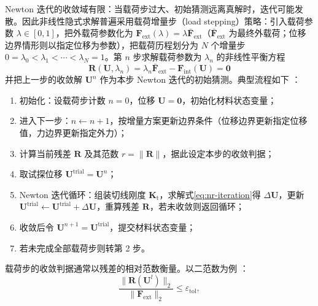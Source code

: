 Newton 迭代的收敛域有限：当载荷步过大、初始猜测远离真解时，迭代可能发散。因此非线性隐式求解普遍采用载荷增量步（load stepping）策略：引入载荷参数 $\lambda\in[0,1]$，把外载荷参数化为 $\mathbf{F}_{\mathrm{ext}}(\lambda)=\lambda\bar{\mathbf{F}}_{\mathrm{ext}}$（$\bar{\mathbf{F}}_{\mathrm{ext}}$ 为最终外载荷；位移边界情形则以指定位移为参数），把载荷历程划分为 $N$ 个增量步 $0=\lambda_{0}<\lambda_{1}<\cdots<\lambda_{N}=1$。第 $n$ 步求解载荷参数为 $\lambda_{n}$ 的非线性平衡方程
\begin{equation}
  \mathbf{R}(\mathbf{U},\lambda_{n})=\lambda_{n}\bar{\mathbf{F}}_{\mathrm{ext}}-\mathbf{F}_{\mathrm{int}}(\mathbf{U})=\mathbf{0}
  \label{eq:load-stepping-equation}
\end{equation}
并把上一步的收敛解 $\mathbf{U}^{n}$ 作为本步 Newton 迭代的初始猜测。典型流程如下 \cite{Littlewood2015}：
\begin{enumerate}
  \item 初始化：设载荷步计数 $n=0$，位移 $\mathbf{U}=\mathbf{0}$，初始化材料状态变量；
  \item 进入下一步：$n\leftarrow n+1$，按增量方案更新边界条件（位移边界更新指定位移值，力边界更新指定外力）；
  \item 计算当前残差 $\mathbf{R}$ 及其范数 $r=\lVert\mathbf{R}\rVert$，据此设定本步的收敛判据；
  \item 取试探位移 $\mathbf{U}^{\mathrm{trial}}=\mathbf{U}^{n}$；
  \item Newton 迭代循环：组装切线刚度 $\mathbf{K}_{\mathrm{t}}$，求解式\eqref{eq:nr-iteration}得 $\Delta\mathbf{U}$，更新 $\mathbf{U}^{\mathrm{trial}}\leftarrow\mathbf{U}^{\mathrm{trial}}+\Delta\mathbf{U}$，重算残差 $\mathbf{R}$，若未收敛则返回循环；
  \item 收敛后令 $\mathbf{U}^{n+1}=\mathbf{U}^{\mathrm{trial}}$，提交材料状态变量；
  \item 若未完成全部载荷步则转第 2 步。
\end{enumerate}
载荷步的收敛判据通常以残差的相对范数衡量。以二范数为例 \cite{Hashim2020}：
\begin{equation}
  \frac{\lVert\mathbf{R}(\mathbf{U}^{l})\rVert_{2}}{\lVert\mathbf{F}_{\mathrm{ext}}\rVert_{2}}\le\varepsilon_{\mathrm{tol}},
  \label{eq:convergence-residual}
\end{equation}
